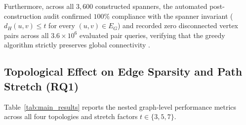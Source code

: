 \documentclass[conference]{IEEEtran}
\begin{document}
Furthermore, across all $3,600$ constructed spanners, the automated post-construction audit confirmed $100\%$ compliance with the spanner invariant ($d_H(u, v) \le t$ for every $(u, v) \in E_G$) and recorded zero disconnected vertex pairs across all $3.6 \times 10^6$ evaluated pair queries, verifying that the greedy algorithm strictly preserves global connectivity \cite{ref1, ref2}.

\begin{table}[t]
\centering
\caption{Baseline Structural Profiles Across Topological Families ($n = 30$ Independent Instances Per Topology, $N = 1,000$ Vertices)}
\label{tab:baseline_profiles}
\footnotesize
\setlength{\tabcolsep}{4pt}
\renewcommand{\arraystretch}{1.15}

\end{table}

\subsection{Topological Effect on Edge Sparsity and Path Stretch (RQ1)}

Table~\ref{tab:main_results} reports the nested graph-level performance metrics across all four topologies and stretch factors $t \in \{3, 5, 7\}$.
\end{document}
